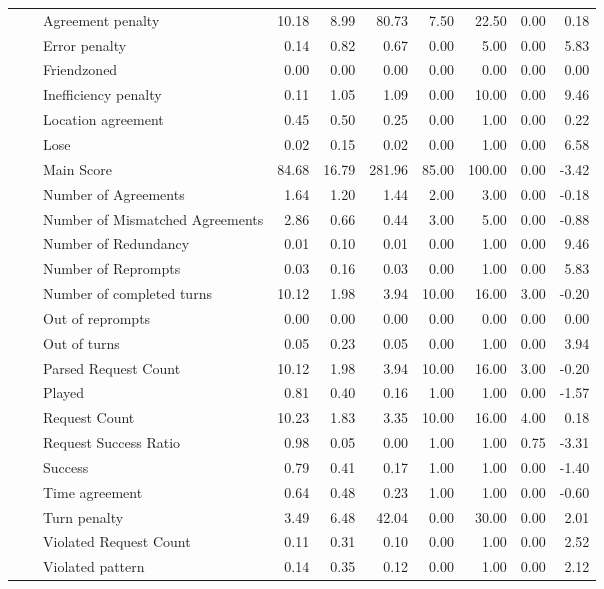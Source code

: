 \begin{tabular}{lllrrrrrrr}
 &  & Agreement penalty & 10.18 & 8.99 & 80.73 & 7.50 & 22.50 & 0.00 & 0.18 \\
 &  & Error penalty & 0.14 & 0.82 & 0.67 & 0.00 & 5.00 & 0.00 & 5.83 \\
 &  & Friendzoned & 0.00 & 0.00 & 0.00 & 0.00 & 0.00 & 0.00 & 0.00 \\
 &  & Inefficiency penalty & 0.11 & 1.05 & 1.09 & 0.00 & 10.00 & 0.00 & 9.46 \\
 &  & Location agreement & 0.45 & 0.50 & 0.25 & 0.00 & 1.00 & 0.00 & 0.22 \\
 &  & Lose & 0.02 & 0.15 & 0.02 & 0.00 & 1.00 & 0.00 & 6.58 \\
 &  & Main Score & 84.68 & 16.79 & 281.96 & 85.00 & 100.00 & 0.00 & -3.42 \\
 &  & Number of Agreements & 1.64 & 1.20 & 1.44 & 2.00 & 3.00 & 0.00 & -0.18 \\
 &  & Number of Mismatched Agreements & 2.86 & 0.66 & 0.44 & 3.00 & 5.00 & 0.00 & -0.88 \\
 &  & Number of Redundancy & 0.01 & 0.10 & 0.01 & 0.00 & 1.00 & 0.00 & 9.46 \\
 &  & Number of Reprompts & 0.03 & 0.16 & 0.03 & 0.00 & 1.00 & 0.00 & 5.83 \\
 &  & Number of completed turns & 10.12 & 1.98 & 3.94 & 10.00 & 16.00 & 3.00 & -0.20 \\
 &  & Out of reprompts & 0.00 & 0.00 & 0.00 & 0.00 & 0.00 & 0.00 & 0.00 \\
 &  & Out of turns & 0.05 & 0.23 & 0.05 & 0.00 & 1.00 & 0.00 & 3.94 \\
 &  & Parsed Request Count & 10.12 & 1.98 & 3.94 & 10.00 & 16.00 & 3.00 & -0.20 \\
 &  & Played & 0.81 & 0.40 & 0.16 & 1.00 & 1.00 & 0.00 & -1.57 \\
 &  & Request Count & 10.23 & 1.83 & 3.35 & 10.00 & 16.00 & 4.00 & 0.18 \\
 &  & Request Success Ratio & 0.98 & 0.05 & 0.00 & 1.00 & 1.00 & 0.75 & -3.31 \\
 &  & Success & 0.79 & 0.41 & 0.17 & 1.00 & 1.00 & 0.00 & -1.40 \\
 &  & Time agreement & 0.64 & 0.48 & 0.23 & 1.00 & 1.00 & 0.00 & -0.60 \\
 &  & Turn penalty & 3.49 & 6.48 & 42.04 & 0.00 & 30.00 & 0.00 & 2.01 \\
 &  & Violated Request Count & 0.11 & 0.31 & 0.10 & 0.00 & 1.00 & 0.00 & 2.52 \\
 &  & Violated pattern & 0.14 & 0.35 & 0.12 & 0.00 & 1.00 & 0.00 & 2.12 \\

\end{tabular}
